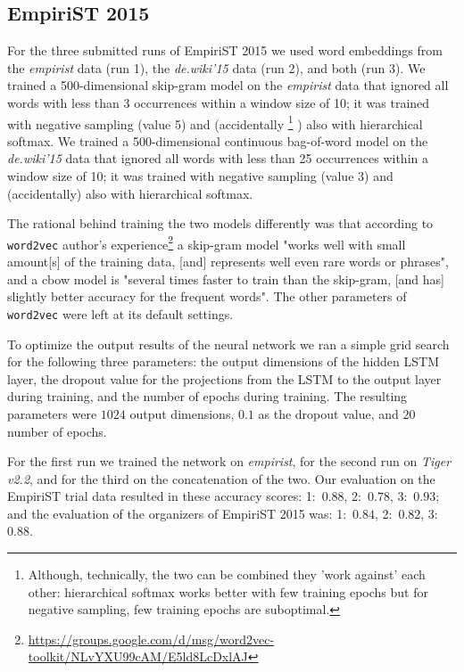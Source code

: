 \documentclass[11pt]{article}
\begin{document}
\subsection{EmpiriST 2015}
\label{ssec:case_empirist}

For the three submitted  runs of EmpiriST 2015 we used word embeddings from the
\emph{empirist} data (run 1), the \emph{de.wiki'15} data (run 2), and both (run
3).  We trained a 500-dimensional skip-gram model on the \emph{empirist} data
that ignored all words with less than 3 occurrences within a window size of 10;
it was trained with negative sampling (value 5) and (accidentally%
\footnote{Although, technically, the two can be combined they 'work against'
each other: hierarchical softmax works better with few training epochs but for
negative sampling, few training epochs are suboptimal.}%
) also with hierarchical softmax.
We trained a 500-dimensional continuous bag-of-word model on the
\emph{de.wiki'15} data that ignored all words with less than 25 occurrences
within a window size of 10; it was trained with negative sampling (value 3) and
(accidentally) also with hierarchical softmax.

The rational behind training the two models differently was that according to
\texttt{word2vec} author's
experience\footnote{\url{https://groups.google.com/d/msg/word2vec-toolkit/NLvYXU99cAM/E5ld8LcDxlAJ}}
a skip-gram model "works well with small amount[s] of the training data, [and]
represents well even rare words or phrases", and a cbow model is "several times
faster to train than the skip-gram, [and has] slightly better accuracy for the
frequent words".
The other parameters of \texttt{word2vec} were left at its default settings.

To optimize the output results of the neural network we ran a simple grid
search for the following three parameters: the output dimensions of the hidden
LSTM layer, the dropout value for the projections from the LSTM to the output
layer during training, and the number of epochs during training. The resulting
parameters were $1024$ output dimensions, $0.1$ as the dropout value, and $20$
number of epochs.

For the first run we trained the network on \emph{empirist}, for the second run
on \emph{Tiger v2.2}, and for the third on the concatenation of the two. %
Our evaluation on the EmpiriST trial data resulted in these accuracy scores:
1:~$0.88$, 
2:~$0.78$, 
3:~$0.93$;
and the evaluation of the organizers of EmpiriST 2015 was:
1:~$0.84$,
2:~$0.82$,
3:~$0.88$.
\end{document}
